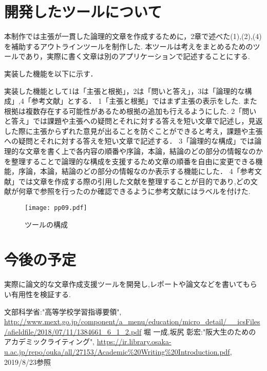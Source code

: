 \documentclass[twocolumn,10pt,a4j]{jsarticle}
\begin{document}
\section{開発したツールについて}
本制作では主張が一貫した論理的文章を作成するために，2章で述べた(1),(2),(4)を補助するアウトラインツールを制作した.
本ツールは考えをまとめるためのツールであり，実際に書く文章は別のアプリケーションで記述することにする.

実装した機能を以下に示す．

実装した機能として\textcircled{\scriptsize{1}}は「主張と根拠」，\textcircled{\scriptsize{2}}は「問いと答え」，\textcircled{\scriptsize{3}}は「論理的な構成」,\textcircled{\scriptsize{4}}「参考文献」とする．
\textcircled{\scriptsize{1}}「主張と根拠」ではまず主張の表示をした.
また根拠は複数存在する可能性があるため根拠の追加も行えるようにした.
\textcircled{\scriptsize{2}}「問いと答え」では課題や主張への疑問とそれに対する答えを短い文章で記述し，見返した際に主張からずれた意見が出ることを防ぐことができると考え，課題や主張への疑問とそれに対する答えを短い文章で記述する．
\textcircled{\scriptsize{3}}「論理的な構成」では論理的な文章を書く上で各内容の順番や序論，本論，結論のどの部分の情報なのかを整理することで論理的な構成を支援するため文章の順番を自由に変更できる機能，序論，本論，結論のどの部分の情報なのか表示する機能にした．
\textcircled{\scriptsize{4}}「参考文献」では文章を作成する際の引用した文献を整理することが目的であり,どの文献が何章で参照を行ったのか確認できるように参考文献にはラベルを付けた.


\begin{figure}[h]
\begin{center}
 \texttt{[image: pp09.pdf]}
\end{center}
 \caption{ツールの構成}
 \label{fig:教科書}
\end{figure}

\section{今後の予定}
実際に論文的な文章作成支援ツールを開発し,レポートや論文などを書いてもらい有用性を検証する.

\begin{thebibliography}{99}
 文部科学省:"高等学校学習指導要領",
\url{http://www.mext.go.jp/component/a_menu/education/micro_detail/__icsFiles/afieldfile/2018/07/11/1384661_6_1_2.pdf}
 堀 一成,坂尻 彰宏:"阪大生のためのアカデミックライティング",
\url{https://ir.library.osaka-u.ac.jp/repo/ouka/all/27153/Academic%20Writing%20Introduction.pdf}, 2019/8/23参照


\end{thebibliography}
\end{document}
